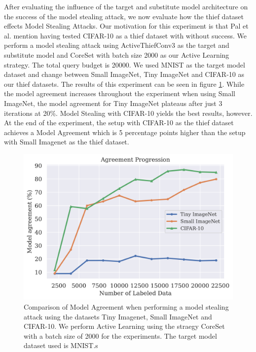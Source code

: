 After evaluating the influence of the target and substitute model architecture on the success of the model stealing attack, we now evaluate how the thief dataset effects Model Stealing Attacks. Our motivation for this experiment is that Pal et al. 
mention having tested CIFAR-10 as a thief dataset with without success. We perform a model stealing attack using ActiveThiefConv3 as the target and substitute model and CoreSet with batch size 2000 as our Active Learning strategy. The total query budget
is 20000. We used MNIST as the target model dataset and change between Small ImageNet, Tiny ImageNet and CIFAR-10 as our thief datasets. The results of this experiment can be seen in figure \ref{fig:Evaluation:Results:CAL:EffectDataset}. While the model agreement 
increases throughout the experiment when using Small ImageNet, the model agreement for Tiny ImageNet plateaus after just 3 iterations at 20\%. Model Stealing with CIFAR-10 yields the best results, however. At the end of the experiment, the setup with CIFAR-10 as 
the thief dataset achieves a Model Agreement which is 5 percentage points higher than the setup with Small Imagenet as the thief dataset. \par

\begin{figure}[h]
    \centering
    \includegraphics[width=0.8\linewidth]{images/results_CALMS/effect_dataset.png}
    \caption[Effect of Thief Dataset choice on the success of Model Stealing Attacks]{Comparison of Model Agreement when performing a model stealing attack using the datasets Tiny Imagenet, Small ImageNet and CIFAR-10. We perform Active Learning using the 
    straegy CoreSet with a batch size of 2000 for the experiments. The target model dataset used is MNIST.s}
    \label{fig:Evaluation:Results:CAL:EffectDataset}
\end{figure}